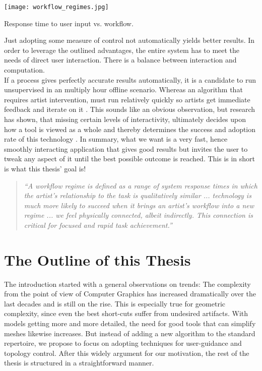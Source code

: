 \begin{floatingfigure}[r]{0.40\textwidth}
\centering
\texttt{[image: workflow\_regimes.jpg]}
\caption{Response time to user input vs. workflow.}
\label{fig:workflow_regimes}
\end{floatingfigure}
Just adopting some measure of control not automatically yields better results. 
In order to leverage the outlined advantages, the entire system has to meet the needs of direct user interaction.
There is a balance between interaction and computation.\\
If a process gives perfectly accurate results automatically, it is a candidate to run unsupervised in an multiply hour offline scenario.
Whereas an algorithm that requires artist intervention, must run relatively quickly so artists get immediate feedback and iterate on it \citep[cf.][p.20]{Hillman2010}.
This sounds like an obvious observation, but research has shown, that missing certain levels of interactivity, ultimately decides upon how a tool is viewed as a whole and thereby determines the success and adoption rate of this technology \citep[cf.][]{Enderton2011}.
In summary, what we want is a very fast, hence smoothly interacting application that gives good results but invites the user to tweak any aspect of it until the best possible outcome is reached.
This is in short is what this thesis' goal is!
\begin{quote} \textit{``A workflow regime is defined as a range of system response times in which the artist’s relationship to the task is qualitatively similar ... technology is much more likely to succeed when it brings an artist’s workflow into a new regime ... we feel physically connected, albeit indirectly. This connection is critical for focused and rapid task achievement.''} \citep[p.2]{Enderton2011} \end{quote}

\section{The Outline of this Thesis}
\label{introduction5}

The introduction started with a general observations on trends:
The complexity from the point of view of Computer Graphics has increased dramatically over the last decades and is still on the rise.
This is especially true for geometric complexity, since even the best short-cuts suffer from undesired artifacts. 
With models getting more and more detailed, the need for good tools that can simplify meshes likewise increases. 
But instead of adding a new algorithm to the standard repertoire, we propose to focus on adopting techniques for user-guidance and topology control.
After this widely argument for our motivation, the rest of the thesis is structured in a straightforward manner.

